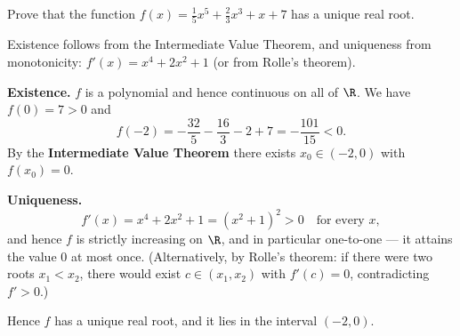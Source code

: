 
\begin{question}
Prove that the function $f(x)=\frac15x^5+\frac23x^3+x+7$ has a unique real root.
\end{question}

\begin{hint}
Existence follows from the Intermediate Value Theorem, and uniqueness from monotonicity: $f'(x)=x^4+2x^2+1$ (or from Rolle's theorem).
\end{hint}

\begin{solution}
\textbf{Existence.} $f$ is a polynomial and hence continuous on all of $\R$. We have $f(0)=7>0$ and
\[ f(-2)=-\frac{32}{5}-\frac{16}{3}-2+7=-\frac{101}{15}<0. \]
By the \textbf{Intermediate Value Theorem} there exists $x_0\in(-2,0)$ with $f(x_0)=0$.

\textbf{Uniqueness.}
\[ f'(x)=x^4+2x^2+1=(x^2+1)^2>0\quad\text{for every } x, \]
and hence $f$ is strictly increasing on $\R$, and in particular one-to-one --- it attains the value $0$ at most once.
(Alternatively, by Rolle's theorem: if there were two roots $x_1<x_2$, there would exist $c\in(x_1,x_2)$ with $f'(c)=0$, contradicting $f'>0$.)

Hence $f$ has a unique real root, and it lies in the interval $(-2,0)$.
\end{solution}

